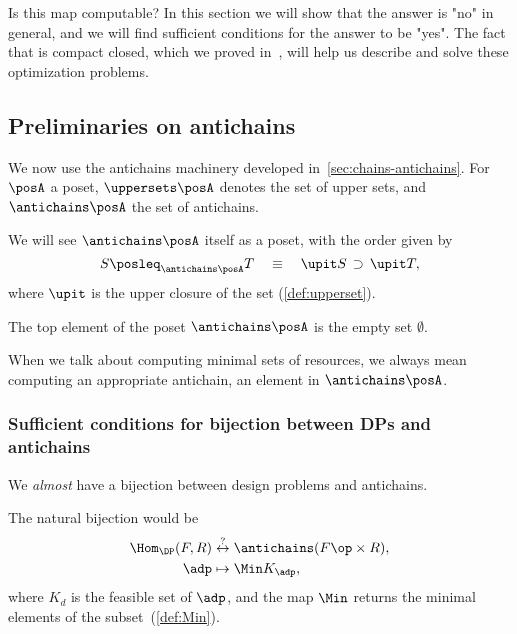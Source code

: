 Is this map computable?
In this section we will show that the answer is "no" in general, and we will find sufficient conditions for the answer to be "yes".
The fact that \DP is compact closed, which we proved in~\XXX, will help us describe and solve these optimization problems.

\subsection{Preliminaries on antichains}

We now use the antichains machinery developed in~\cref{sec:chains-antichains}.
For $\posA$ a poset, $\uppersets \posA$ denotes the set of upper sets, and $\antichains \posA$ the set of antichains.


We will see $\antichains \posA$ itself as a poset, with the order given by
\begin{equation*}
	S \posleq_{\antichains \posA} T  \quad \equiv \quad\upit S\, \supset\,\upit T,
\end{equation*}
where $\upit$ is the upper closure of the set (\cref{def:upperset}).

The top element of the poset $\antichains\posA$ is the empty set $\emptyset$.

When we talk about computing minimal sets of resources, we always mean computing an appropriate antichain, \ie an element in $\antichains \posA$.

\subsubsection{Sufficient conditions for bijection between DPs and antichains}

We \emph{almost} have a bijection between design problems and antichains.

The natural bijection would be
\begin{equation}
	\begin{aligned}
		\Hom_\DP(F,R) & \overset{?
		}{\leftrightarrow} \antichains (F\op \times R), \\
		\adp          & \mapsto \Min K_\adp,
	\end{aligned}
\end{equation}
where $K_d$ is the feasible set of $\adp$,
and the map $\Min$ returns the minimal elements of the subset~(\cref{def:Min}).

